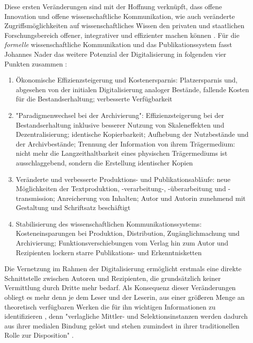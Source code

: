 Diese ersten Veränderungen sind mit der Hoffnung verknüpft, dass offene Innovation und offene wissenschaftliche Kommunikation, wie auch veränderte Zugriffsmöglichkeiten auf wissenschaftliches Wissen \cite[:109]{naeder_2010_open} den privaten und staatlichen Forschungsbereich offener, integrativer und effizienter machen können \cite{harmon_2012_commercialization}. Für die \textit{formelle} wissenschaftliche Kommunikation und das Publikationssystem fasst Johannes Nader das weitere Potenzial der Digitalisierung in folgenden vier Punkten zusammen \cite[:66-76]{naeder_2010_open}:
\begin{enumerate}
\item Ökonomische Effizienzsteigerung und Kostenersparnis: Platzersparnis und, abgesehen von der initialen Digitalisierung analoger Bestände, fallende Kosten für die Bestandserhaltung; verbesserte Verfügbarkeit
\item "Paradigmenwechsel bei der Archivierung": Effizienzsteigerung bei der Bestandserhaltung inklusive besserer Nutzung von Skaleneffekten und Dezentralisierung; identische Kopierbarkeit; Aufhebung der Nutzbestände und der Archivbestände; Trennung der Information von ihrem Trägermedium: nicht mehr die Langzeithaltbarkeit eines physischen Trägermediums ist ausschlaggebend, sondern die Erstellung identischer Kopien
\item Veränderte und verbesserte Produktions- und Publikationsabläufe: neue Möglichkeiten der Textproduktion, -verarbeitung-, -überarbeitung und -transmission; Anreicherung von Inhalten; Autor und Autorin zunehmend mit Gestaltung und Schriftsatz beschäftigt
\item Stabilisierung des wissenschaftlichen Kommunikationssystems: Kosteneinsparungen bei Produktion, Distribution, Zugänglichmachung und Archivierung; Funktionsverschiebungen vom Verlag hin zum Autor und Rezipienten lockern starre Publikations- und Erkenntnisketten
\end{enumerate}

Die Vernetzung im Rahmen der Digitalisierung ermöglicht erstmals eine direkte Schnittstelle zwischen Autoren und Rezipienten, die grundsätzlich keiner Vermittlung durch Dritte mehr bedarf. Als Konsequenz dieser Veränderungen obliegt es mehr denn je dem Leser und der Leserin, aus einer größeren Menge an theoretisch verfügbaren Werken die für ihn wichtigen Informationen zu identifizieren \cite{hagner_2015_sache_buches}, denn "verlagliche Mittler- und Selektionsinstanzen werden dadurch aus ihrer medialen Bindung gelöst und stehen zumindest in ihrer traditionellen Rolle zur Disposition" \cite[:109]{naeder_2010_open}.

